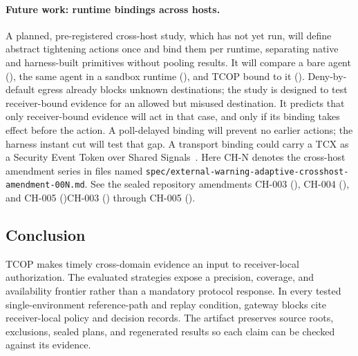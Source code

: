 \paragraph{Future work: runtime bindings across hosts.}
A planned, pre-registered cross-host study, which has not yet run, will define abstract tightening actions once and bind them per runtime, separating native and harness-built primitives without pooling results. It will compare a bare agent (\FutureBareArm{}), the same agent in a sandbox runtime (\FutureSandboxArm{}), and TCOP bound to it (\FutureTCOPArm{}). Deny-by-default egress already blocks unknown destinations; the study is designed to test receiver-bound evidence for an allowed but misused destination. It predicts that only receiver-bound evidence will act in that case, and only if its binding takes effect before the action. A poll-delayed binding will prevent no earlier actions; the harness instant cut will test that gap. A transport binding could carry a TCX as a Security Event Token over Shared Signals~\cite{rfc8417,openid-ssf-1.0}. Here CH-N denotes the cross-host amendment series in files named \nolinkurl{spec/external-warning-adaptive-crosshost-amendment-00N.md}. See the sealed repository amendments \ifdefined\TCOPPreprint CH-003 (), CH-004 (), and CH-005 ()\else CH-003 () through CH-005 ()\fi.

\subsection{Conclusion}

TCOP makes timely cross-domain evidence an input to receiver-local authorization. The evaluated strategies expose a precision, coverage, and availability frontier rather than a mandatory protocol response. In every tested single-environment reference-path and replay condition, gateway blocks cite receiver-local policy and decision records. The artifact preserves source roots, exclusions, sealed plans, and regenerated results so each claim can be checked against its evidence.
